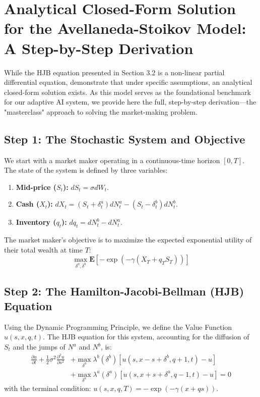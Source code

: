 \section{Analytical Closed-Form Solution for the Avellaneda-Stoikov Model: A Step-by-Step Derivation}
\label{sec:as_masterclass}
While the HJB equation presented in Section 3.2 is a non-linear partial differential equation, \citet{Avellaneda2008} demonstrate that under specific assumptions, an analytical closed-form solution exists. As this model serves as the foundational benchmark for our adaptive AI system, we provide here the full, step-by-step derivation—the "masterclass" approach to solving the market-making problem.

\subsection{Step 1: The Stochastic System and Objective}
We start with a market maker operating in a continuous-time horizon $[0, T]$. The state of the system is defined by three variables:
\begin{enumerate}
    \item \textbf{Mid-price ($S_t$):} $dS_t = \sigma dW_t$.
    \item \textbf{Cash ($X_t$):} $dX_t = (S_t + \delta^a_t) dN^a_t - (S_t - \delta^b_t) dN^b_t$.
    \item \textbf{Inventory ($q_t$):} $dq_t = dN^b_t - dN^a_t$.
\end{enumerate}
The market maker's objective is to maximize the expected exponential utility of their total wealth at time $T$:
\begin{equation}
    \max_{\delta^a, \delta^b} \mathbf{E} \left[ -\exp(-\gamma (X_T + q_T S_T)) \right]
\end{equation}

\subsection{Step 2: The Hamilton-Jacobi-Bellman (HJB) Equation}
Using the Dynamic Programming Principle, we define the Value Function $u(s, x, q, t)$. The HJB equation for this system, accounting for the diffusion of $S_t$ and the jumps of $N^a$ and $N^b$, is:
\begin{equation}
\begin{aligned}
    \frac{\partial u}{\partial t} + \frac{1}{2} \sigma^2 \frac{\partial^2 u}{\partial s^2} &+ \max_{\delta^b} \lambda^b(\delta^b) [u(s, x-s+\delta^b, q+1, t) - u] \\
    &+ \max_{\delta^a} \lambda^a(\delta^a) [u(s, x+s+\delta^a, q-1, t) - u] = 0
\end{aligned}
\end{equation}
with the terminal condition: $u(s, x, q, T) = -\exp(-\gamma (x + qs))$.

